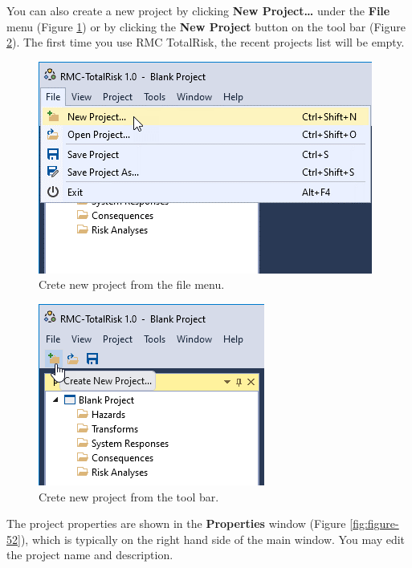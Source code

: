 \documentclass[
]{book}
\begin{document}
You can also create a new project by clicking \textbf{New Project\ldots{}} under the \textbf{File} menu (Figure \ref{fig:figure-50}) or by clicking the \textbf{New Project} button on the tool bar (Figure \ref{fig:figure-51}). The first time you use RMC TotalRisk, the recent projects list will be empty.

\begin{figure}

{\centering \includegraphics{images/figure50} 

}

\caption{Crete new project from the file menu.}\label{fig:figure-50}
\end{figure}

\begin{figure}

{\centering \includegraphics{images/figure51} 

}

\caption{Crete new project from the tool bar.}\label{fig:figure-51}
\end{figure}

The project properties are shown in the \textbf{Properties} window (Figure \ref{fig:figure-52}), which is typically on the right hand side of the main window. You may edit the project name and description.
\end{document}
